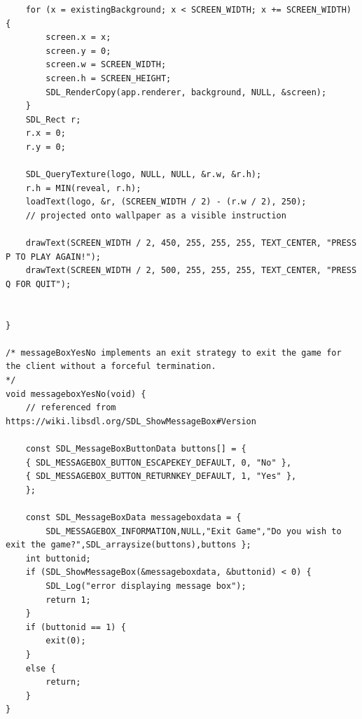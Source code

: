 \documentclass{article}
\begin{document}
\begin{lstlisting}
	for (x = existingBackground; x < SCREEN_WIDTH; x += SCREEN_WIDTH) {
		screen.x = x;
		screen.y = 0;
		screen.w = SCREEN_WIDTH;
		screen.h = SCREEN_HEIGHT;
		SDL_RenderCopy(app.renderer, background, NULL, &screen);
	}
	SDL_Rect r;
	r.x = 0;
	r.y = 0;

	SDL_QueryTexture(logo, NULL, NULL, &r.w, &r.h);
	r.h = MIN(reveal, r.h);
	loadText(logo, &r, (SCREEN_WIDTH / 2) - (r.w / 2), 250);
	// projected onto wallpaper as a visible instruction

	drawText(SCREEN_WIDTH / 2, 450, 255, 255, 255, TEXT_CENTER, "PRESS P TO PLAY AGAIN!");
	drawText(SCREEN_WIDTH / 2, 500, 255, 255, 255, TEXT_CENTER, "PRESS Q FOR QUIT");


}

/* messageBoxYesNo implements an exit strategy to exit the game for the client without a forceful termination.
*/
void messageboxYesNo(void) {
	// referenced from https://wiki.libsdl.org/SDL_ShowMessageBox#Version

	const SDL_MessageBoxButtonData buttons[] = {
	{ SDL_MESSAGEBOX_BUTTON_ESCAPEKEY_DEFAULT, 0, "No" },
	{ SDL_MESSAGEBOX_BUTTON_RETURNKEY_DEFAULT, 1, "Yes" },
	};

	const SDL_MessageBoxData messageboxdata = {
		SDL_MESSAGEBOX_INFORMATION,NULL,"Exit Game","Do you wish to exit the game?",SDL_arraysize(buttons),buttons };
	int buttonid;
	if (SDL_ShowMessageBox(&messageboxdata, &buttonid) < 0) {
		SDL_Log("error displaying message box");
		return 1;
	}
	if (buttonid == 1) {
		exit(0);
	}
	else {
		return;
	}
}
\end{lstlisting}
\end{document}

